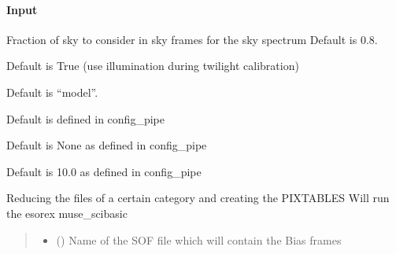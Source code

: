 \documentclass[letterpaper,10pt,english]{sphinxmanual}
\begin{document}
\begin{fulllineitems}
\begin{fulllineitems}
\paragraph{Input}
\label{\detokenize{api/pymusepipe:id106}}\begin{description}
\sphinxAtStartPar
Fraction of sky to consider in sky frames for the sky spectrum
Default is 0.8.

\sphinxAtStartPar
Default is True (use illumination during twilight calibration)

\sphinxAtStartPar
Default is “model”.

\sphinxAtStartPar
Default is defined in config\_pipe

\sphinxAtStartPar
Default is None as defined in config\_pipe

\sphinxAtStartPar
Default is 10.0 as defined in config\_pipe

\end{description}

\end{fulllineitems}


\begin{fulllineitems}
\label{\detokenize{api/pymusepipe:pymusepipe.prep_recipes_pipe.PipePrep.run_scibasic}}
\pysigstartsignatures
{}
\pysigstopsignatures
\sphinxAtStartPar
Reducing the files of a certain category and creating the PIXTABLES
Will run the esorex muse\_scibasic
\begin{quote}\begin{description}
\begin{itemize}
\item {} 
\sphinxAtStartPar
{} (\sphinxstyleliteralemphasis{\sphinxupquote{ (}}\sphinxstyleliteralemphasis{\sphinxupquote{)}}) \textendash{} Name of the SOF file which will contain the Bias frames


\end{itemize}
\end{description}
\end{quote}
\end{fulllineitems}
\end{fulllineitems}
\end{document}

